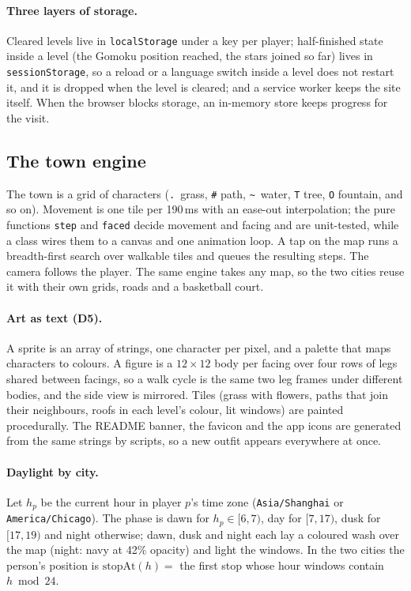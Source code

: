 \documentclass[sigconf,nonacm]{acmart}
\newcommand{\code}[1]{\texttt{\small #1}}
\newcommand{\dc}[1]{\textsc{D#1}}
\begin{document}
\paragraph{Three layers of storage.} Cleared levels live in \code{localStorage} under a key per
player; half-finished state inside a level (the Gomoku position reached, the stars joined so far)
lives in \code{sessionStorage}, so a reload or a language switch inside a level does not restart it,
and it is dropped when the level is cleared; and a service worker keeps the site itself. When the
browser blocks storage, an in-memory store keeps progress for the visit.

\subsection{The town engine}
The town is a grid of characters (\code{.}\ grass, \code{\#} path, \code{\textasciitilde}\ water,
\code{T} tree, \code{O} fountain, and so on). Movement is one tile per 190\,ms with an ease-out
interpolation; the pure functions \code{step} and \code{faced} decide movement and facing and are
unit-tested, while a class wires them to a canvas and one animation loop. A tap on the map runs a
breadth-first search over walkable tiles and queues the resulting steps. The camera follows the
player. The same engine takes any map, so the two cities reuse it with their own grids, roads and a
basketball court.

\paragraph{Art as text (\dc{5}).} A sprite is an array of strings, one character per pixel, and
a palette that maps characters to colours. A figure is a $12\times12$ body per facing over four
rows of legs shared between facings, so a walk cycle is the same two leg frames under different
bodies, and the side view is mirrored. Tiles (grass with flowers, paths that join their neighbours,
roofs in each level's colour, lit windows) are painted procedurally. The README banner, the favicon
and the app icons are generated from the same strings by scripts, so a new outfit appears
everywhere at once.

\paragraph{Daylight by city.} Let $h_p$ be the current hour in player $p$'s time zone
(\code{Asia/Shanghai} or \code{America/Chicago}). The phase is dawn for $h_p \in [6,7)$, day for
$[7,17)$, dusk for $[17,19)$ and night otherwise; dawn, dusk and night each lay a coloured wash over
the map (night: navy at 42\% opacity) and light the windows. In the two cities the person's
position is $\mathrm{stopAt}(h) = $ the first stop whose hour windows contain $h \bmod 24$.
\end{document}
